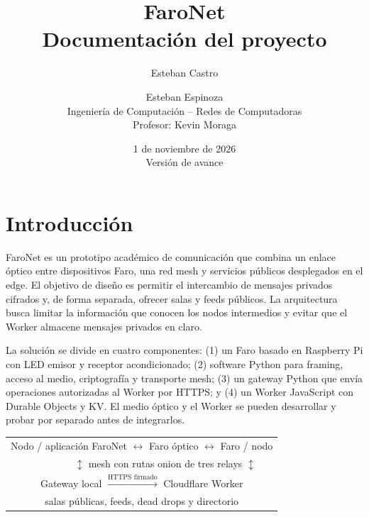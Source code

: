 \documentclass[12pt,a4paper]{article}
\title{\textbf{FaroNet}\\Documentación del proyecto}
\author{Esteban Castro \and Esteban Espinoza\\[4pt]
Ingeniería de Computación -- Redes de Computadoras\\
Profesor: Kevin Moraga}
\date{1 de noviembre de 2026\\Versión de avance}
\begin{document}
\maketitle
\begin{center}
\end{center}
\tableofcontents
\newpage

\section{Introducción}

FaroNet es un prototipo académico de comunicación que combina un enlace óptico
entre dispositivos Faro, una red mesh y servicios públicos desplegados en el
edge. El objetivo de diseño es permitir el intercambio de mensajes privados
cifrados y, de forma separada, ofrecer salas y feeds públicos. La arquitectura
busca limitar la información que conocen los nodos intermedios y evitar que el
Worker almacene mensajes privados en claro.

La solución se divide en cuatro componentes: (1) un Faro basado en Raspberry Pi
con LED emisor y receptor acondicionado; (2) software Python para framing,
acceso al medio, criptografía y transporte mesh; (3) un gateway Python que
envía operaciones autorizadas al Worker por HTTPS; y (4) un Worker JavaScript
con Durable Objects y KV. El medio óptico y el Worker se pueden desarrollar y
probar por separado antes de integrarlos.

\begin{center}
\begin{tabular}{c}
Nodo / aplicación FaroNet $\leftrightarrow$ Faro óptico $\leftrightarrow$ Faro / nodo\\
$\hspace{2cm}\updownarrow$ mesh con rutas onion de tres relays $\updownarrow$\\
Gateway local $\xrightarrow{\text{HTTPS firmado}}$ Cloudflare Worker\\
\hspace{2cm}salas públicas, feeds, dead drops y directorio
\end{tabular}
\end{center}
\end{document}
